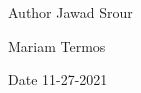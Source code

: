 \begin{DoxyAuthor}{Author}
Jawad Srour 

Mariam Termos 
\end{DoxyAuthor}
\begin{DoxyDate}{Date}
11-\/27-\/2021 
\end{DoxyDate}

